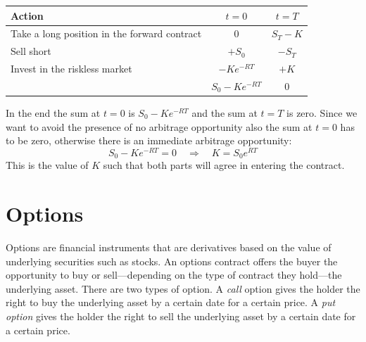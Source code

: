 \begin{center}
    \begin{tabular}{lcc}\toprule
        Action & $t=0$ & $t=T$ \\\midrule
        Take a long position in the forward contract &  0 & $S_T-K$ \\
        Sell short & $+S_0$ & $-S_T$ \\
        Invest in the riskless market & $-Ke^{-RT}$ & $+K$ \\ \midrule\midrule
         & $S_0-Ke^{-RT}$ & $0$ \\\bottomrule
    \end{tabular}
\end{center}
In the end the sum at $t=0$ is $S_0-Ke^{-RT}$ and the sum at $t=T$ is zero. Since we want to avoid the presence of no arbitrage opportunity also the sum at $t=0$ has to be zero, otherwise there is an immediate arbitrage opportunity:
\begin{equation}
    S_0-Ke^{-RT} = 0 \quad\Rightarrow\quad K = S_0e^{RT}
\end{equation}
This is the value of $K$ such that both parts will agree in entering the contract.  

\section{Options}
Options are financial instruments that are derivatives based on the value of underlying securities such as stocks. An options contract offers the buyer the opportunity to buy or sell—depending on the type of contract they hold—the underlying asset. There are two types of option. A \emph{call} option gives the holder the right to buy the underlying asset by a certain date for a certain price. A \emph{put option} gives the holder the right to sell the underlying asset by a certain date for a certain price.

